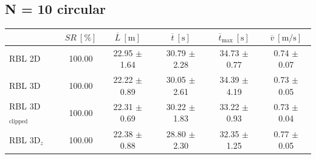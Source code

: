         \subsection{N = 10 circular}
            \begin{table}[H]
                \centering
                \renewcommand{\arraystretch}{1.2}
                \begin{tabular}{|l|c|c|c|c|c|}
                \hline
                                            & \( SR \ [\%] \) & \( \overline{L} \ [\mathrm{m}] \) & \( \overline{t} \ [\mathrm{s}] \) & \( \overline{t}_{\text{max}} \ [\mathrm{s}] \) & \( \overline{v} \ [\mathrm{m/s}] \)     \\ \hline
                RBL 2D                      & 100.00          & 22.95 $\pm$ 1.64                  & 30.79 $\pm$ 2.28                  & 34.73 $\pm$ 0.77                               & 0.74 $\pm$ 0.07                         \\ \hline
                RBL 3D                      & 100.00          & 22.22 $\pm$ 0.89                  & 30.05 $\pm$ 2.61                  & 34.39 $\pm$ 4.19                               & 0.73 $\pm$ 0.05                         \\ \hline
                RBL 3D\(_{\text{clipped}}\) & 100.00          & 22.31 $\pm$ 0.69                  & 30.22 $\pm$ 1.83                  & 33.22 $\pm$ 0.93                               & 0.73 $\pm$ 0.04                         \\ \hline
                RBL 3D\(_z\)                & 100.00          & 22.38 $\pm$ 0.88                  & 28.80 $\pm$ 2.30                  & 32.35 $\pm$ 1.25                               & 0.77 $\pm$ 0.05                         \\ \hline
                \end{tabular}
            \end{table}
        
